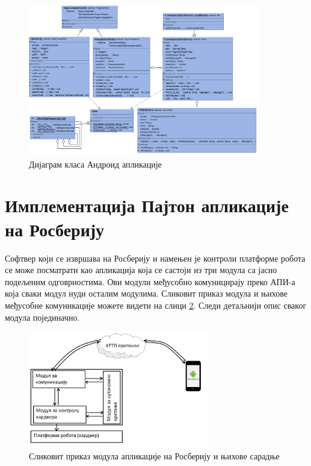 \documentclass[12pt,oneside]{memoir}
\theoremstyle{remark}
\begin{document}
\begin{figure}[!ht]
\centering
\includegraphics[width=0.9\textwidth]{slike/dijagramklasa.png}
\caption{Дијаграм класа Андроид апликације}
\label{fig:dijagramklasaapp}
\end{figure}

\section{Имплементација Пајтон апликације на Росберију}
Софтвер који се извршава на Росберију и намењен је контроли платформе робота се може посматрати као апликација која се састоји из три модула са јасно подељеним одговрностима. Ови модули међусобно комуницирају преко АПИ-а која сваки модул нуди осталим модулима. Сликовит приказ модула и њихове међусобне комуникације можете видети на слици \ref{fig:rpisoftvare}.
Следи детаљнији опис сваког модула појединачно.
\begin{figure}[!ht]
\centering
\includegraphics[width=0.7\textwidth]{slike/rpisoftvers.png}
\caption{Сликовит приказ модула апликације на Росберију и њихове сарадње}
\label{fig:rpisoftvare}
\end{figure}
\end{document}
